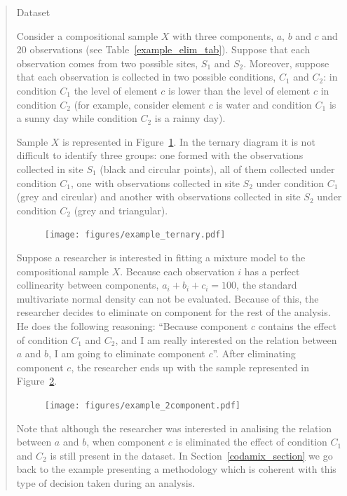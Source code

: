 \documentclass[10pt, a4paper]{article}
\begin{document}
\begin{quote}
\begin{table}
\centering
\scriptsize

\label{example_elim_tab}
\caption{Dataset}
\end{table}

Consider a compositional sample $X$ with three components, $a$, $b$ and $c$ and $20$ observations (see Table~\ref{example_elim_tab}). Suppose that each observation comes from two possible sites, $S_1$ and $S_2$. Moreover, suppose that each observation is collected in two possible conditions, $C_1$ and $C_2$: in condition $C_1$ the level of element $c$ is lower than the level of element $c$ in condition $C_2$ (for example, consider element $c$ is water and condition $C_1$ is a sunny day while condition $C_2$ is a rainny day).

Sample $X$ is represented in Figure~\ref{example_elim_component}. In the ternary diagram it is not difficult to identify three groups: one formed with the observations collected in site $S_1$ (black and circular points), all of them collected under condition $C_1$, one with observations collected in site $S_2$ under condition $C_1$ (grey and circular) and another with observations collected in site $S_2$ under condition $C_2$ (grey and triangular).

\begin{figure}[thbp]
\centering
\texttt{[image: figures/example\_ternary.pdf]}
\caption{}\label{example_elim_component}
\end{figure}

Suppose a researcher is interested in fitting a mixture model to the compositional sample $X$. Because each observation $i$ has a perfect collinearity between components, $a_i+b_i+c_i = 100$, the standard multivariate normal density can not be evaluated. Because of this, the researcher decides to eliminate on component for the rest of the analysis. He does the following reasoning: ``Because component $c$ contains the effect of condition $C_1$ and $C_2$, and I am really interested on the relation between $a$ and $b$, I am going to eliminate component $c$''. After eliminating component $c$, the researcher ends up with the sample represented in Figure~\ref{example_elim_2_components}.

\begin{figure}[thbp]
\centering
\texttt{[image: figures/example\_2component.pdf]}
\caption{}\label{example_elim_2_components}
\end{figure}

Note that although the researcher was interested in analising the relation between $a$ and $b$, when component $c$ is eliminated the effect of condition $C_1$ and $C_2$  is still present in the dataset. In Section~\ref{codamix_section} we go back to the example presenting a methodology which is coherent with this type of decision taken during an analysis.

\end{quote}
\end{document}

